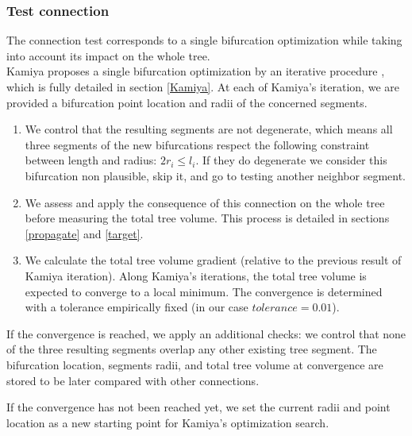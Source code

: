 \documentclass[a4paper, 11pt]{article} %
\begin{document}
\subsubsection{Test connection}

The connection test corresponds to a single bifurcation optimization while taking into account its impact on the whole tree.\\

Kamiya proposes a single bifurcation optimization by an iterative procedure \cite{kamiya1972optimal}, which is fully detailed in section \ref{Kamiya}. 
At each of Kamiya's iteration, we are provided a bifurcation point location and radii of the concerned segments. 
\begin{enumerate}
\item  We control that the resulting segments are not degenerate, which means all three segments of the new bifurcations respect the following constraint between length and radius: $2r_i \leq l_i$. If they do degenerate we consider this bifurcation non plausible, skip it, and go to testing another neighbor segment.

\item We assess and apply the consequence of this connection on the whole tree before measuring the total tree volume. This process is detailed in sections \ref{propagate} and \ref{target}.

\item We calculate the total tree volume gradient (relative to the previous result of Kamiya iteration).
Along Kamiya's iterations, the total tree volume is expected to converge to a local minimum. The convergence is determined with a tolerance empirically fixed (in our case $tolerance = 0.01$). 

\end{enumerate}

 
If the convergence is reached, we apply an additional checks: we control that none of the three resulting segments overlap any other existing tree segment.
The bifurcation location, segments radii, and total tree volume at convergence are stored to be later compared with other connections.

If the convergence has not been reached yet, we set the current radii and point location as a new starting point for Kamiya's optimization search.

\end{document}
